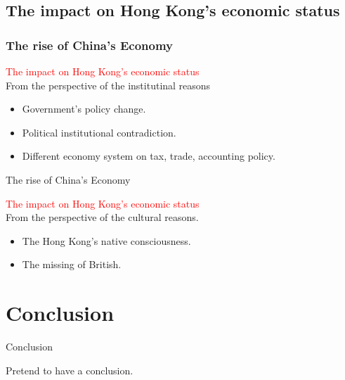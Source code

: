 \documentclass[slidestop,uncompress,mathsans, 12pt]{beamer}
\begin{document}
\subsection{The impact on Hong Kong's economic status}
\begin{frame}
\frametitle{The rise of China's Economy}
\textcolor{red}{The impact on Hong Kong's economic status}\\
\bigskip
From the perspective of the institutinal reasons\\

\bigskip
\begin{itemize}
\item Government's policy change.
\bigskip
\item Political institutional contradiction.
\bigskip
\item Different economy system on tax, trade, accounting policy.
\end{itemize}

\end{frame}

\begin{frame}{The rise of China's Economy}

\textcolor{red}{The impact on Hong Kong's economic status}\\
\bigskip
From the perspective of the cultural reasons.\\
\bigskip
\begin{itemize}
\item The Hong Kong’s native consciousness.
\bigskip
\item The missing of British.
\end{itemize}


\end{frame}

\section{Conclusion}
\begin{frame}{Conclusion}

\bigskip
\bigskip

\begin{block}{}
Pretend to have a conclusion.
\end{block}
\end{frame}
\begin{frame}
\bigskip
\bigskip
\bigskip
\bigskip
\bigskip
\bigskip
\bigskip


\\ 
\end{frame}
\end{document}
